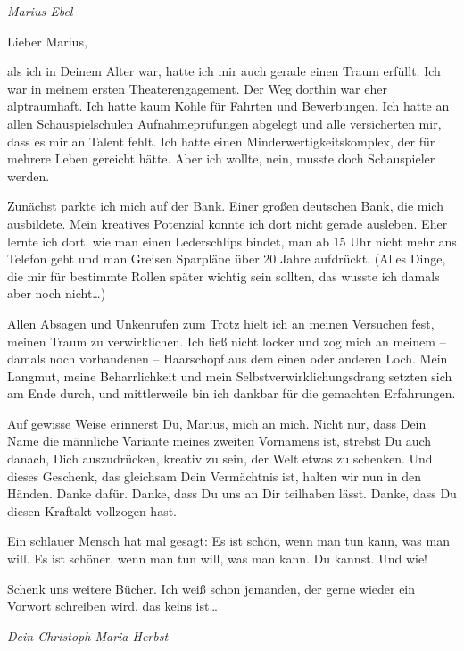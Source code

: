 \documentclass[fontsize=14pt,a4paper,headinclude,DIV=calc,automark]{scrbook}
\begin{document}
\vspace{0.5cm}
\noindent\textit{Marius Ebel}

\vspace{-1\baselineskip}
Lieber Marius,\par
\vspace{0\baselineskip}

\noindent als ich in Deinem Alter war, hatte ich mir auch gerade einen Traum erfüllt: Ich war in meinem ersten Theaterengagement.
Der Weg dorthin war eher alptraumhaft. Ich hatte kaum Kohle für Fahrten und Bewerbungen. Ich hatte an allen Schauspielschulen Aufnahmeprüfungen abgelegt und alle versicherten mir, dass es mir an Talent fehlt. Ich hatte einen Minderwertigkeitskomplex, der für mehrere Leben gereicht hätte.
Aber ich wollte, nein, musste doch Schauspieler werden.

Zunächst parkte ich mich auf der Bank. Einer großen deutschen Bank, die mich ausbildete. Mein kreatives Potenzial konnte ich dort nicht gerade ausleben. Eher lernte ich dort, wie man einen Lederschlips bindet, man ab 15 Uhr nicht mehr ans Telefon geht und man Greisen Sparpläne über 20 Jahre aufdrückt. (Alles Dinge, die mir für bestimmte Rollen später wichtig sein sollten, das wusste ich damals aber noch nicht…)

Allen Absagen und Unkenrufen zum Trotz hielt ich an meinen Versuchen fest, meinen Traum zu verwirklichen.
Ich ließ nicht locker und zog mich an meinem – damals noch vorhandenen – Haarschopf aus dem einen oder anderen Loch. Mein Langmut, meine Beharrlichkeit und mein Selbstverwirklichungsdrang setzten sich am Ende durch, und mittlerweile bin ich dankbar für die gemachten Erfahrungen.

Auf gewisse Weise erinnerst Du, Marius, mich an mich. Nicht nur, dass Dein Name die männliche Variante meines zweiten Vornamens ist, strebst Du auch danach, Dich auszudrücken, kreativ zu sein, der Welt etwas zu schenken. Und dieses Geschenk, das gleichsam Dein Vermächtnis ist, halten wir nun in den Händen.
Danke dafür. Danke, dass Du uns an Dir teilhaben lässt. Danke, dass Du diesen Kraftakt vollzogen hast.

Ein schlauer Mensch hat mal gesagt: Es ist schön, wenn man tun kann, was man will. Es ist schöner, wenn man tun will, was man kann.
Du kannst. Und wie!

Schenk uns weitere Bücher. Ich weiß schon jemanden, der gerne wieder ein Vorwort schreiben wird, das keins ist…

\vspace{0.5cm}
\noindent\textit{Dein Christoph Maria Herbst}
\end{document}
